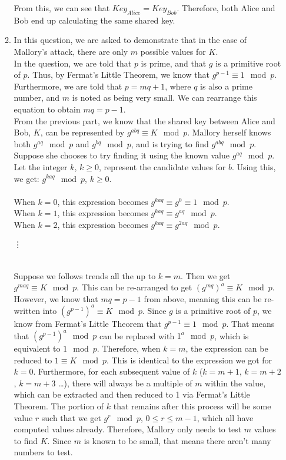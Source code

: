 \documentclass[11pt]{article}
\theoremstyle{definition}
\begin{document}
\begin{enumerate}
\begin{enumerate}
From this, we can see that $Key_{Alice} = Key_{Bob}$. Therefore, both Alice and Bob end up calculating the same shared key.

\item In this question, we are asked to demonstrate that  in the case of Mallory's attack, there are only $m$ possible values for $K$. \\

In the question, we are told that $p$ is prime, and that $g$ is a primitive root of $p$. Thus, by Fermat's Little Theorem, we know that $g^{p-1} \equiv 1 \mod{p}$. Furthermore, we are told that $p = mq + 1$, where $q$ is also a prime number, and $m$ is noted as being very small. We can rearrange this equation to obtain $mq = p-1$. 
\\
From the previous part, we know that the shared key between Alice and Bob, $K$, can be represented by $g^{abq} \equiv K \mod{p}$. Mallory herself knows both $g^{aq} \mod{p}$ and $g^{bq} \mod{p}$, and is trying to find $g^{abq} \mod{p}$. Suppose she chooses to try finding it using the known value $g^{aq} \mod{p}$. Let the integer $k$, $k \geq 0$, represent the candidate values for $b$. Using this, we get: $g^{kaq} \mod{p}$, $k \geq 0$.\\ \\
When $k = 0$, this expression becomes $g^{kaq} \equiv g^{0} \equiv 1 \mod{p}$.\\
When $k = 1$, this expression becomes $g^{kaq} \equiv g^{aq} \mod{p}$.\\
When $k = 2$, this expression becomes $g^{kaq} \equiv g^{2aq} \mod{p}$.\\
\centerline{\vdots} \\
Suppose we follows trends all the up to $k = m$. Then we get $g^{maq} \equiv K \mod{p}$. This can be re-arranged to get $(g^{mq})^a \equiv K \mod{p}$. However, we know that $mq = p - 1$ from above, meaning this can be re-written into $(g^{p - 1})^a \equiv K \mod{p}$. Since $g$ is a primitive root of $p$, we know from Fermat's Little Theorem that $g^{p - 1} \equiv 1 \mod{p}$. That means that $(g^{p-1})^a \mod{p}$ can be replaced with $1^a \mod{p}$, which is equivalent to $1 \mod{p}$. Therefore, when $k = m$, the expression can be reduced to $1 \equiv K \mod{p}$. This is identical to the expression we got for $k = 0$. Furthermore, for each subsequent value of $k$ ($k = m + 1$, $k = m + 2$, $k = m +3$ \ldots), there will always be a multiple of $m$ within the value, which can be extracted and then reduced to 1 via Fermat's Little Theorem. The portion of $k$ that remains after this process will be some value $r$ such that we get $g^r \mod{p} $, $0 \leq r \leq m - 1$, which all have computed values already. Therefore, Mallory only needs to test $m$ values to find $K$. Since $m$ is known to be small, that means there aren't many numbers to test.
\\


\end{enumerate}
\end{enumerate}
\end{document}
